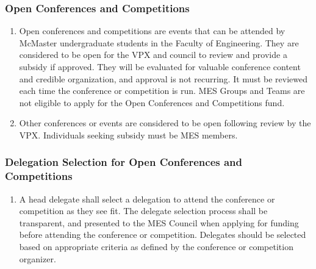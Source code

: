\hypertarget{open-conferences-and-competitions}{%
 \subsubsection{Open Conferences and
  Competitions}
 \label{open-conferences-and-competitions}}

\begin{enumerate}
 \item
  Open conferences and competitions are events that can be attended by
  McMaster undergraduate students in the Faculty of Engineering. They
  are considered to be open for the VPX and council to review and
  provide a subsidy if approved. They will be evaluated for valuable
  conference content and credible organization, and approval is not
  recurring. It must be reviewed each time the conference or competition
  is run. MES Groups and Teams are not eligible to apply for the Open
  Conferences and Competitions fund.
 \item
  Other conferences or events are considered to be open following review
  by the VPX. Individuals seeking subsidy must be MES members.

\end{enumerate}

\hypertarget{delegation-selection-for-open-conferences-and-competitions}{%
 \subsubsection{Delegation Selection for Open Conferences and
  Competitions}
 \label{delegation-selection-for-open-conferences-and-competitions}}

\begin{enumerate}
 \item
  A head delegate shall select a delegation to attend the conference or
  competition as they see fit. The delegate selection process shall be
  transparent, and presented to the MES Council when applying for
  funding before attending the conference or competition. Delegates
  should be selected based on appropriate criteria as defined by the
  conference or competition organizer.
\end{enumerate}

